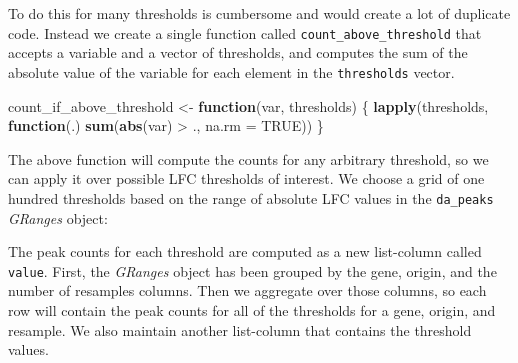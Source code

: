 \documentclass[
]{article}
\newenvironment{Shaded}{}{}
\newcommand{\ControlFlowTok}[1]{\textcolor[rgb]{0.00,0.44,0.13}{\textbf{#1}}}
\newcommand{\DataTypeTok}[1]{\textcolor[rgb]{0.56,0.13,0.00}{#1}}
\newcommand{\DecValTok}[1]{\textcolor[rgb]{0.25,0.63,0.44}{#1}}
\newcommand{\KeywordTok}[1]{\textcolor[rgb]{0.00,0.44,0.13}{\textbf{#1}}}
\newcommand{\NormalTok}[1]{#1}
\newcommand{\OperatorTok}[1]{\textcolor[rgb]{0.40,0.40,0.40}{#1}}
\newcommand{\OtherTok}[1]{\textcolor[rgb]{0.00,0.44,0.13}{#1}}
\newcommand{\StringTok}[1]{\textcolor[rgb]{0.25,0.44,0.63}{#1}}
\begin{document}
To do this for many thresholds is cumbersome and would create a lot of
duplicate code. Instead we create a single function called
\texttt{count\_above\_threshold} that accepts a variable and a vector of thresholds, and
computes the sum of the absolute value of the variable for each element in the
\texttt{thresholds} vector.

\begin{Shaded}
\begin{Highlighting}[]
\NormalTok{count_if_above_threshold <-}\StringTok{ }\ControlFlowTok{function}\NormalTok{(var, thresholds) \{}
  \KeywordTok{lapply}\NormalTok{(thresholds, }\ControlFlowTok{function}\NormalTok{(.) }\KeywordTok{sum}\NormalTok{(}\KeywordTok{abs}\NormalTok{(var) }\OperatorTok{>}\StringTok{ }\NormalTok{., }\DataTypeTok{na.rm =} \OtherTok{TRUE}\NormalTok{))}
\NormalTok{\}}
\end{Highlighting}
\end{Shaded}

The above function will compute the counts for any arbitrary threshold, so we
can apply it over possible LFC thresholds of interest. We choose a grid of one
hundred thresholds based on the range of absolute LFC values in the \texttt{da\_peaks}
\emph{GRanges} object:

\begin{Shaded}
\end{Shaded}

The peak counts for each threshold are computed as a new list-column called
\texttt{value}. First, the \emph{GRanges} object has been grouped by the gene, origin, and
the number of resamples columns. Then we aggregate over those columns, so each
row will contain the peak counts for all of the thresholds for a gene,
origin, and resample. We also maintain another list-column that contains the
threshold values.

\begin{Shaded}
\end{Shaded}
\end{document}
